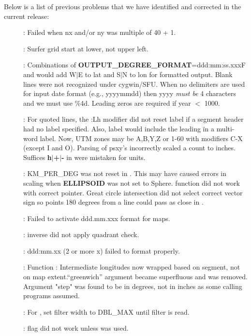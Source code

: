 Below is a list of previous problems that we have identified and corrected in the current release:
\begin{description}
\item []: Failed when nx and/or ny was multiple of 40 + 1.
\item []: Surfer grid start at lower, not upper left.
\item []: Combinations of {\bf OUTPUT\_DEGREE\_FORMAT}=ddd:mm:ss.xxxF and \Opt{:}
would add W$|$E to lat and S$|$N to lon for formatted output.
Blank lines were not recognized under cygwin/SFU.
When no delimiters are used for input date format (e.g., yyyymmdd) then yyyy \emph{must be} 4 characters
and we must use \%4d.  Leading zeros are required if year $<$ 1000.
\item []: For quoted lines, the :Lh modifier did not reset label if
a segment header had no label specified.  Also, label would include the leading \" in a multi-word label.
Now, UTM zones may be A,B,Y,Z or 1-60 with modifiers C-X (except I and O).
Parsing of psxy's  incorrectly scaled a count to inches.
Suffices {\bf h$|$+$|$-} in  were mistaken for units.
\item []: KM\_PER\_DEG was not reset in . This may have caused
errors in scaling when {\bf ELLIPSOID} was not set to Sphere.   function did not work with correct pointer.
Great circle intersection did not select correct vector sign so
points 180 degrees from a line could pass as close in .
\item []: Failed to activate ddd.mm.xxx format for maps.
\item []:  inverse did not apply quadrant check.
\item []: ddd:mm.xx (2 or more x) failed to format properly.
\item []: Function : Intermediate longitudes now wrapped based on segment,
not on map extent.``greenwich'' argument became superfluous and was
removed. Argument "step" was found to be in degrees, not in inches as some calling programs assumed.
\item []: For , set filter width to DBL\_MAX until filter is read.
\item []:  flag did not work unless  was used.

\end{description}
